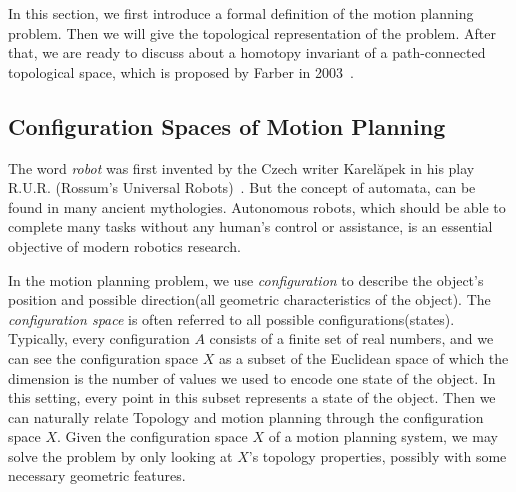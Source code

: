 In this section, we first introduce a formal definition of the motion planning problem. Then we will give the topological representation of the problem. After that, we are ready to discuss about a homotopy invariant of a path-connected topological space, which is proposed by Farber in 2003~\cite{DBLP:journals/dcg/Farber03}.

\subsection{Configuration Spaces of Motion Planning}
The word \textit{robot} was first invented by the Czech writer Karel\u{a}pek in his play R.U.R. (Rossum's Universal Robots)~\cite{zunt2002did}. But the concept of automata, can be found in many ancient mythologies. Autonomous robots, which should be able to complete many tasks without any human's control or assistance, is an essential objective of modern robotics research.

In the motion planning problem, we use \textit{configuration} to describe the object's position and possible direction(all geometric characteristics of the object).
The \textit{configuration space} is often referred to all possible configurations(states).
Typically, every configuration \(A\) consists of a finite set of real numbers, and we can see the configuration space \(X\) as a subset of the Euclidean space of which the dimension is the number of values we used to encode one state of the object.
In this setting, every point in this subset represents a state of the object.
Then we can naturally relate Topology and motion planning through the configuration space \(X\).
Given the configuration space \(X\) of a motion planning system, we may solve the problem by only looking at \(X\)'s topology properties, possibly with some necessary geometric features.


